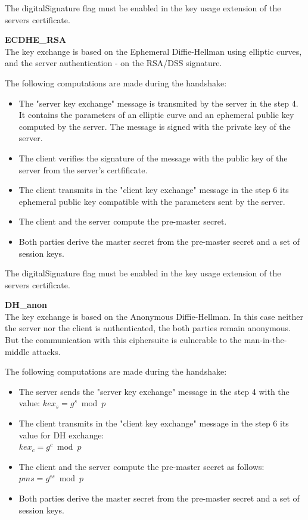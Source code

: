 The digitalSignature flag must be enabled in the key usage extension of the servers certificate.

\textbf{ECDHE\_RSA} \\
The key exchange is based on the Ephemeral Diffie-Hellman using elliptic curves, and the server authentication - on the RSA/DSS signature.

The following computations are made during the handshake:
\begin{itemize}
	\item The "server key exchange" message is transmited by the server in the step 4. It contains the parameters of an elliptic curve and an ephemeral public key computed by the server. The message is signed with the private key of the server.
	\item The client verifies the signature of the message with the public key of the server from the server's certfificate.
	\item The client transmits in the "client key exchange" message in the step 6 its ephemeral public key compatible with the parameters sent by the server.
	\item The client and the server compute the pre-master secret.
	\item Both parties derive the master secret from the pre-master secret and a set of session keys.
\end{itemize}

The digitalSignature flag must be enabled in the key usage extension of the servers certificate.

\textbf{DH\_anon} \\
The key exchange is based on the Anonymous Diffie-Hellman. In this case neither the server nor the client is authenticated, the both parties remain anonymous. But the communication with this ciphersuite is culnerable to the man-in-the-middle attacks.

The following computations are made during the handshake:
\begin{itemize}
	\item The server sends the "server key exchange" message in the step 4 with the value: $\displaystyle kex_s = g^s \bmod p $ 
	\item The client transmits in the "client key exchange" message in the step 6 its value for DH exchange: \\ $\displaystyle kex_c = g^c \bmod p $ 
	\item The client and the server compute the pre-master secret as follows: $\displaystyle pms = g^{cs} \bmod p$
	\item Both parties derive the master secret from the pre-master secret and a set of session keys.
\end{itemize}


